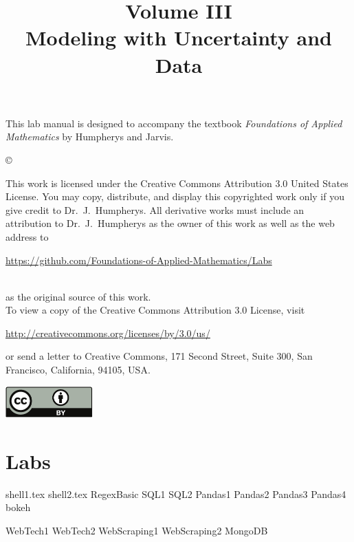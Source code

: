 \documentclass[opener-c,labs,yellow,nociteref]{HJnewsiambook}
\title{Volume III\\ Modeling with Uncertainty and Data}
\begin{document}

\thispagestyle{empty} %
\maketitle
\thispagestyle{empty}
\frontmatter


\begin{thepreface} %

This lab manual is designed to accompany the textbook \emph{Foundations of Applied Mathematics} by Humpherys and Jarvis.

\vfill
\copyright{This work is licensed under the Creative Commons Attribution 3.0 United States
License.  You may copy, distribute, and display this copyrighted work only if you give
credit to Dr.~J.~Humpherys. All derivative works must include an attribution to Dr.~J.~Humpherys as the owner of this work as well as the web address to
\\\centerline{\url{https://github.com/Foundations-of-Applied-Mathematics/Labs}}\\as the original source of this work.
\\To view a copy of the Creative Commons Attribution 3.0 License, visit
\\\centerline{\url{http://creativecommons.org/licenses/by/3.0/us/}} or send a letter to Creative Commons, 171 Second Street, Suite 300, San Francisco, California, 94105, USA.}

\vfill
\centering\includegraphics[height=1.2cm]{by.pdf}
\vfill
\end{thepreface}

\setcounter{tocdepth}{1}
\tableofcontents

\mainmatter %

\part{Labs} %
{shell1.tex}
{shell2.tex}
{RegexBasic}
{SQL1}
{SQL2}
{Pandas1}
{Pandas2}
{Pandas3}
{Pandas4}
{bokeh}

{WebTech1}
{WebTech2}
{WebScraping1}
{WebScraping2}
{MongoDB}
\end{document}

